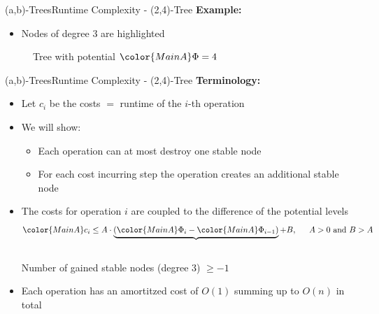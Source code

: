 \begin{frame}{(a,b)-Trees}{Runtime Complexity - (2,4)-Tree}
  \textbf{Example:}
  \begin{itemize}
    \item<2->
      Nodes of {\color{MainA}degree 3} are highlighted
  \end{itemize}
  \begin{figure}[!h]
    \begin{adjustbox}{width=0.8\linewidth}
      
    \end{adjustbox}
    \caption{Tree with potential ${\color{MainA}\Phi} = 4$}
    \label{fig:a_b_tree:potential_introduction}
  \end{figure}
\end{frame}


\begin{frame}{(a,b)-Trees}{Runtime Complexity - (2,4)-Tree}
  \textbf{Terminology:}
  \begin{itemize}
    \item<2->
      Let {\color{MainA}$c_i$} be the costs $=$ runtime of
      the {\color{MainA}$i$}-th operation
    \item<3->
      We will show:
      \begin{itemize}
      \item<4-> Each operation can at most destroy one stable node
      \item<5-> For each cost incurring step the operation
        creates an additional stable node
     \end{itemize}
    \item<6->
      The costs for operation {\color{MainA}$i$} are coupled to the
      difference of the potential levels
      \begin{displaymath}
        {\color{MainA}c_i} \leq A \cdot \underbrace{(
          {\color{MainA}\Phi_i} -
          {\color{MainA}\Phi_{i-1}}
        )} + B, \hspace{1.5em} A > 0 \text{ and } B > A
      \end{displaymath}\\
      \vspace{-0.75em}
      Number of gained stable nodes ({\color{MainA}degree 3}) $\geq -1$
    \item<7->
      Each operation has an amortitzed cost of
      {\color{MainA}$O(1)$} summing up to {\color{MainA}$O(n)$} in total
  \end{itemize}
\end{frame}

